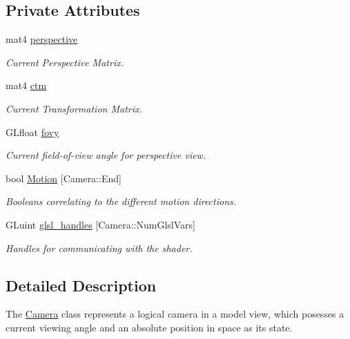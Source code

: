 \subsection*{\-Private \-Attributes}
\begin{DoxyCompactItemize}
\item 
\hypertarget{class_camera_a88e27aa6501579b2bde7e6be0b096a1e}{mat4 \hyperlink{class_camera_a88e27aa6501579b2bde7e6be0b096a1e}{perspective}}\label{class_camera_a88e27aa6501579b2bde7e6be0b096a1e}

\begin{DoxyCompactList}\small\item\em \-Current \-Perspective \-Matrix. \end{DoxyCompactList}\item 
\hypertarget{class_camera_a9b1e81e3f5531390bb6a599dca0d2444}{mat4 \hyperlink{class_camera_a9b1e81e3f5531390bb6a599dca0d2444}{ctm}}\label{class_camera_a9b1e81e3f5531390bb6a599dca0d2444}

\begin{DoxyCompactList}\small\item\em \-Current \-Transformation \-Matrix. \end{DoxyCompactList}\item 
\-G\-Lfloat \hyperlink{class_camera_acc8b97facc57059530efad534c2f8314}{fovy}
\begin{DoxyCompactList}\small\item\em \-Current field-\/of-\/view angle for perspective view. \end{DoxyCompactList}\item 
bool \hyperlink{class_camera_a39746b4fadf30bba6bdc8aa6acfdc6f2}{\-Motion} \mbox{[}\-Camera\-::\-End\mbox{]}
\begin{DoxyCompactList}\small\item\em \-Booleans correlating to the different motion directions. \end{DoxyCompactList}\item 
\-G\-Luint \hyperlink{class_camera_a1635486d7f9e0d52b241899a270ee335}{glsl\-\_\-handles} \mbox{[}\-Camera\-::\-Num\-Glsl\-Vars\mbox{]}
\begin{DoxyCompactList}\small\item\em \-Handles for communicating with the shader. \end{DoxyCompactList}\end{DoxyCompactItemize}


\subsection{\-Detailed \-Description}
\-The \hyperlink{class_camera}{\-Camera} class represents a logical camera in a model view, which posesses a current viewing angle and an absolute position in space as its state. 

